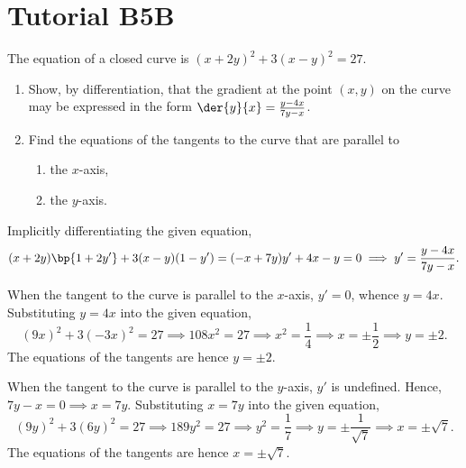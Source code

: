 \section{Tutorial B5B}

\begin{problem}
    The equation of a closed curve is $(x+2y)^2 + 3(x-y)^2 = 27$.

    \begin{enumerate}
        \item Show, by differentiation, that the gradient at the point $(x,y)$ on the curve may be expressed in the form $\der{y}{x} = \frac{y-4x}{7y-x}$.
        \item Find the equations of the tangents to the curve that are parallel to
        \begin{enumerate}
            \item the $x$-axis,
            \item the $y$-axis.
        \end{enumerate}
    \end{enumerate}
\end{problem}
\begin{solution}
    \begin{ppart}
        Implicitly differentiating the given equation, \[(x+2y)\bp{1 + 2y'} + 3(x-y)(1 - y') = (-x + 7y)y' + 4x - y = 0 \implies y' = \frac{y-4x}{7y-x}.\]
    \end{ppart}
    \begin{ppart}
        \begin{psubpart}
            When the tangent to the curve is parallel to the $x$-axis, $y' = 0$, whence $y = 4x$. Substituting $y=4x$ into the given equation, \[(9x)^2 + 3(-3x)^2 = 27 \implies 108x^2 = 27 \implies x^2 = \frac14 \implies x = \pm \frac12 \implies y = \pm 2.\] The equations of the tangents are hence $y = \pm 2$.
        \end{psubpart}
        \begin{psubpart}
            When the tangent to the curve is parallel to the $y$-axis, $y'$ is undefined. Hence, $7y-x =0 \implies x = 7y$. Substituting $x = 7y$ into the given equation, \[(9y)^2 + 3(6y)^2 = 27 \implies 189y^2 = 27 \implies y^2 = \frac17 \implies y = \pm \frac1{\sqrt7} \implies x = \pm \sqrt7.\] The equations of the tangents are hence $x = \pm \sqrt7$.
        \end{psubpart}
    \end{ppart}
\end{solution}

